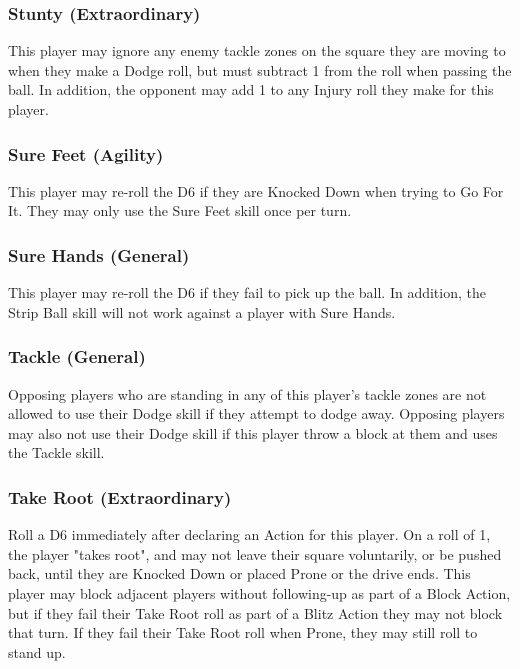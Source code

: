 \begin{multicols}{3}
\subsubsection{Stunty (Extraordinary)}
\par This player may ignore any enemy tackle zones on the square they are moving to when they make a Dodge roll, but must subtract 1 from the roll when passing the ball. In addition, the opponent may add 1 to any Injury roll they make for this player.

\subsubsection{Sure Feet (Agility)}
\par This player may re-roll the D6 if they are Knocked Down when trying to Go For It. They may only use the Sure Feet skill once per turn.

\subsubsection{Sure Hands (General)}
\par This player may re-roll the D6 if they fail to pick up the ball. In addition, the Strip Ball skill will not work against a player with Sure Hands.

\subsubsection{Tackle (General)}
\par Opposing players who are standing in any of this player's tackle zones are not allowed to use their Dodge skill if they attempt to dodge away. Opposing players may also not use their Dodge skill if this player throw a block at them and uses the Tackle skill.

\subsubsection{Take Root (Extraordinary)}
\par Roll a D6 immediately after declaring an Action for this player. On a roll of 1, the player "takes root", and may not leave their square voluntarily, or be pushed back, until they are Knocked Down or placed Prone or the drive ends. This player may block adjacent players without following-up as part of a Block Action, but if they fail their Take Root roll as part of a Blitz Action they may not block that turn.  If they fail their Take Root roll when Prone, they may still roll to stand up.


\end{multicols}
